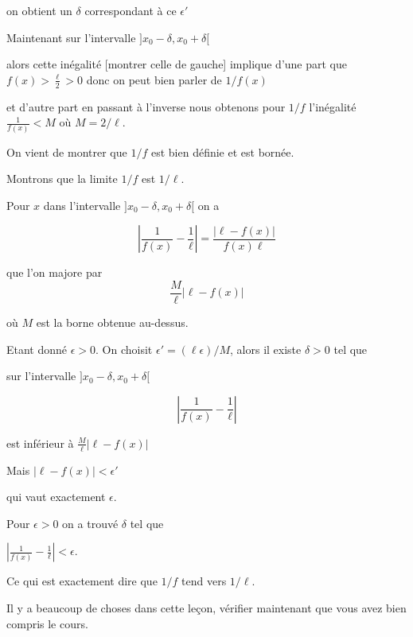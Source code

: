 on obtient un $\delta$ correspondant à ce $\epsilon'$ 

Maintenant sur l'intervalle $]x_0-\delta,x_0+\delta [$ 

\change

alors  cette inégalité [montrer celle de gauche] implique d'une part
que $f(x)> \frac{\ell}{2}>0$ donc on peut bien parler de $1/f(x)$

\change

et d'autre part en passant à l'inverse nous obtenons pour $1/f$ l'inégalité
$\frac{1}{f(x)} < M$ où $M=2/\ell$.

On vient de montrer que $1/f$ est bien définie et est bornée.

\change

Montrons que la limite $1/f$ est $1/\ell$.


\change

Pour $x$ dans l'intervalle $]x_0-\delta,x_0+\delta [$ on a

$$
\left\vert \frac{1}{f(x)} - \frac1\ell  \right\vert = \frac{\left\vert \ell - f(x) \right\vert }{f(x)\ell} $$

\change

que l'on majore par $$\frac{M}{\ell}\left\vert \ell - f(x) \right\vert$$ 

où $M$ est la borne obtenue au-dessus.

\change

Etant donné $\epsilon>0$. On choisit $\epsilon'=(\ell \epsilon)/M$, 
alors il existe $\delta>0$ tel que

sur l'intervalle $]x_0-\delta,x_0+\delta [$


$$\left\vert \frac{1}{f(x)} - \frac1\ell  \right\vert$$

\change

est inférieur à 
$\frac{M}{\ell}\left\vert \ell - f(x) \right\vert $

\change

Mais $\left\vert \ell - f(x) \right\vert < \epsilon'$

\change

qui vaut exactement $\epsilon$.

Pour $\epsilon >0$ on a trouvé $\delta$ tel que

$\left\vert \frac{1}{f(x)} - \frac1\ell  \right\vert <\epsilon$.

Ce qui est exactement dire que $1/f$ tend vers $1/\ell$.


\diapo

Il y a beaucoup de choses dans cette leçon, vérifier maintenant 
que vous avez bien compris le cours.


